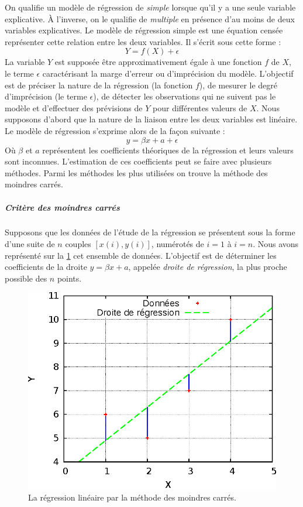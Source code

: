 On qualifie un modèle de régression de \textit{simple} lorsque qu'il y a une seule variable explicative. \`A l'inverse, on le qualifie de \textit{multiple} en présence d'au moins de deux variables explicatives. Le modèle de régression simple est une équation censée représenter cette relation entre les deux variables. Il s'écrit sous cette forme :
\begin{equation}
Y = f(X) + \epsilon
\end{equation}
La variable $Y$ est supposée être approximativement égale à une fonction $f$ de $X$, le terme $\epsilon$ caractérisant la marge d'erreur ou d'imprécision du modèle. L'objectif est de préciser la nature de la régression (la fonction $f$), de mesurer le degré d'imprécision (le terme $\epsilon$), de détecter les observations qui ne suivent pas le modèle et d'effectuer des prévisions de $Y$ pour différentes valeurs de $X$. Nous supposons d'abord que la nature de la liaison entre les deux variables est linéaire. Le modèle de régression s'exprime alors de la façon suivante :
\begin{equation}
y = \beta x + a + \epsilon
\end{equation}
Où $\beta$ et $a$ représentent les coefficients théoriques de la régression et leurs valeurs sont inconnues. L'estimation de ces coefficients peut se faire avec plusieurs méthodes. Parmi les méthodes les plus utilisées on trouve la méthode des moindres carrés.

\subparagraph{Critère des moindres carrés}
Supposons que les données de l'étude de la régression se présentent sous la forme d'une suite de $n$ couples $[x(i), y(i)]$, numérotés de $i = 1$ à $i = n$. Nous avons représenté sur la \ref{fig:least-squares} cet ensemble de données. L'objectif est de déterminer les coefficients de la droite $y = \beta x + a$, appelée \textit{droite de régression}, la plus proche possible des $n$ points.

\begin{figure}
 \centering
 \includegraphics[scale=1.0]{chapitre4/chap4Fig/least-squares.eps}
 \caption{La régression linéaire par la méthode des moindres carrés.}
 \label{fig:least-squares}
\end{figure}


